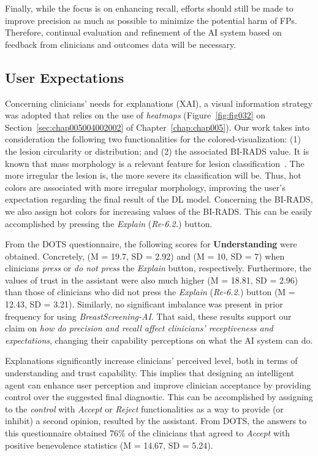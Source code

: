 Finally, while the focus is on enhancing recall, efforts should still be made to improve precision as much as possible to minimize the potential harm of \acp{FP}.
Therefore, continual evaluation and refinement of the \ac{AI} system based on feedback from clinicians and outcomes data will be necessary.

\subsection{User Expectations}
\label{sec:app003004007}

Concerning clinicians' needs for explanations (\acs{XAI}), a visual information strategy was adopted that relies on the use of {\it heatmaps} (Figure~\ref{fig:fig032} on Section~\ref{sec:chap005004002002} of Chapter~\ref{chap:chap005}).
Our work takes into consideration the following two functionalities for the colored-visualization:
(1) the lesion circularity or distribution; and
(2) the associated \ac{BI-RADS} value.
It is known that mass morphology is a relevant feature for lesion classification~\cite{maicas2018training}.
The more irregular the lesion is, the more severe its classification will be.
Thus, hot colors are associated with more irregular morphology, improving the user's expectation regarding the final result of the \ac{DL} model.
Concerning the \ac{BI-RADS}, we also assign hot colors for increasing values of the \ac{BI-RADS}. 
This can be easily accomplished by pressing the {\it Explain} ({\it Re-6.2.}) button.

From the \ac{DOTS} questionnaire, the following scores for {\bf Understanding} were obtained.
Concretely, (M = 19.7, SD = 2.92) and (M = 10, SD = 7) when clinicians {\it press} or {\it do not press} the  {\it Explain} button, respectively.
Furthermore, the values of trust in the assistant were also much higher (M = 18.81, SD = 2.96) than those of clinicians who did not press the {\it Explain} ({\it Re-6.2.}) button (M = 12.43, SD = 3.21).
Similarly, no significant imbalance was present in prior frequency for using {\it BreastScreening-AI}.
That said, these results support our claim on {\it how do precision and recall affect clinicians' receptiveness and expectations}, changing their capability perceptions on what the \ac{AI} system can do.

Explanations significantly increase clinicians’ perceived level, both in terms of understanding and trust capability.
This implies that designing an intelligent agent can enhance user perception and improve clinician acceptance by providing control over the suggested final diagnostic.
This can be accomplished by assigning to the {\it control} with {\it Accept} or {\it Reject} functionalities as a way to provide (or inhibit) a second opinion, resulted by the assistant.
From \ac{DOTS}, the answers to this questionnaire obtained 76\% of the clinicians that agreed to {\it Accept} with positive benevolence statistics (M = 14.67, SD = 5.24).

